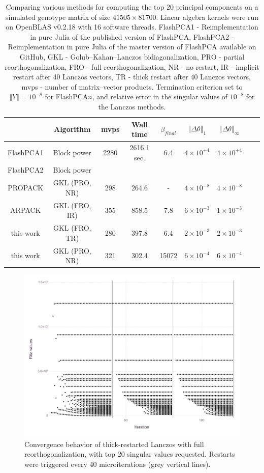 \documentclass[review]{siamart0516}
\begin{document}
\begin{table}
\begin{tabular}{|c|c|c|c|c|c|c|c|c|}
\hline
 & Algorithm & mvps & Wall time & $\beta_{final}$ & $\left\Vert \Delta\theta\right\Vert _{1}$ & $\left\Vert \Delta\theta\right\Vert _{\infty}$\tabularnewline
\hline
\hline
FlashPCA1 & Block power & 2280 & 2616.1 sec. & 6.4 & $4\times10^{+4}$ & $4\times10^{+4}$\tabularnewline
\hline
FlashPCA2 & Block power &  &  &  &  & \tabularnewline
\hline
PROPACK & GKL (PRO, NR) & 298 & 264.6 & - & $4\times10^{-8}$ & $4\times10^{-8}$\tabularnewline
\hline
ARPACK & GKL (FRO, IR) & 355 & 858.5 & 7.8 & $6\times10^{-3}$ & $1\times10^{-3}$\tabularnewline
\hline
this work & GKL (FRO, TR) & 280 & 397.8 & 6.4 & $2\times10^{-3}$ & $2\times10^{-3}$\tabularnewline
\hline
this work & GKL (PRO, NR) & 321 & 302.4 & 15072 & $6\times10^{-4}$ & $6\times10^{-4}$\tabularnewline
\hline
\end{tabular}

\caption{Comparing various methods for computing the top 20 principal
components on a simulated genotype matrix of size $41505\times81700$.
Linear algebra kernels were run on OpenBLAS v0.2.18 with 16 software threads.
FlashPCA1 - Reimplementation in pure Julia of the published version of FlashPCA,
FlashPCA2 - Reimplementation in pure Julia of the master version of FlashPCA available on GitHub,
GKL - Golub--Kahan--Lanczos bidiagonalization,
PRO - partial reorthogonalization,
FRO - full reorthogonalization,
NR - no restart,
IR - implicit restart after 40 Lanczos vectors,
TR - thick restart after 40 Lanczos vectors,
mvps - number of matrix--vector products.
Termination criterion set to $\Vert Y\Vert = 10^{-8}$ for FlashPCA$n$,
and relative error in the singular values of $10^{-8}$ for the Lanczos methods.
}
\end{table}

\begin{figure}
\caption{Convergence behavior of thick-restarted Lanczos with full reorthogonalization, with top 20 singular values requested. Restarts were triggered every 40 microiterations (grey vertical lines).
\label{fig:lanczos-tr}
}

\includegraphics[width=\textwidth]{fig/thickrestarted/fig-conv}
\end{figure}
\end{document}
